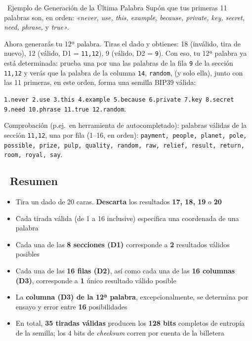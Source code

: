 \documentclass[10pt]{article}
\begin{document}
\begin{examplebox}{\faLightbulb~Ejemplo de Generación de la Última Palabra}
Supón que tus primeras 11 palabras son, en orden: \textit{«never, use, this, example, because, private, key, secret, need, phrase,} y \textit{true»}.

Ahora generarás tu 12ª palabra. Tiras el dado y obtienes: 18 (inválido, tira de nuevo), 12 (válido, D1 = \texttt{11,12}), 9 (válido, D2 = \texttt{9}). Con eso, tu 12ª palabra ya está determinada: prueba una por una las palabras de la fila \texttt{9} de la sección \texttt{11,12} y verás que la palabra de la columna \texttt{14}, \texttt{random}, (y solo ella), junto con las 11 primeras, en este orden, forma una semilla BIP39 válida:

\vspace{0.5em}
\texttt{1.never 2.use 3.this 4.example 5.because 6.private 7.key 8.secret 9.need 10.phrase 11.true 12.random}. \faCheckCircle
\vspace{0.25em}

{\scriptsize Comprobación (p.ej.\ en herramienta de autocompletado): palabras válidas de la sección \texttt{11,12}, una por fila (1--16, en orden): \texttt{payment, people, planet, pole, possible, prize, pulp, quality, random, raw, relief, result, return, room, royal, say}.\par}
\end{examplebox}

\subsection*{\faListOl~Resumen}

\begin{itemize}[itemsep=1pt]
 \item Tira un dado de 20 caras. \textbf{Descarta} los resultados \textbf{17, 18, 19} o \textbf{20}
 \item Cada tirada válida (de 1 a 16 inclusive) especifica una coordenada de una palabra
 \item Cada una de las \textbf{8 secciones (D1)} corresponde a \textbf{2} resultados válidos posibles
 \item Cada una de las \textbf{16 filas (D2)}, así como cada una de las \textbf{16 columnas (D3)}, corresponde a \textbf{1} único resultado válido posible
 \item La \textbf{columna (D3) de la 12ª palabra}, excepcionalmente, se determina por ensayo y error entre \textbf{16} posibilidades
 \item En total, \textbf{35 tiradas válidas} producen los \textbf{128 bits} completos de entropía de la semilla; los 4 bits de \textit{checksum} corren por cuenta de la billetera
\end{itemize}
\end{document}
